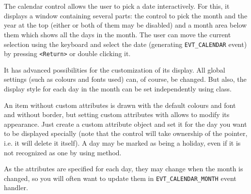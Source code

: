 
\section{}\label{wxcalendarctrl}

The calendar control allows the user to pick a date interactively. For this,
it displays a window containing several parts: the control to pick the month
and the year at the top (either or both of them may be disabled) and a month
area below them which shows all the days in the month. The user can move the
current selection using the keyboard and select the date (generating 
{\tt EVT\_CALENDAR} event) by pressing {\tt <Return>} or double clicking it.

It has advanced possibilities for the customization of its display. All global
settings (such as colours and fonts used) can, of course, be changed. But
also, the display style for each day in the month can be set independently
using  class.

An item without custom attributes is drawn with the default colours and
font and without border, but setting custom attributes with 
 allows to modify its appearance. Just
create a custom attribute object and set it for the day you want to be
displayed specially (note that the control will take ownership of the pointer,
i.e. it will delete it itself). A day may be marked as being a holiday, even
if it is not recognized as one by  using 
 method.

As the attributes are specified for each day, they may change when the month
is changed, so you will often want to update them in 
{\tt EVT\_CALENDAR\_MONTH} event handler.


\\
\\
\\

